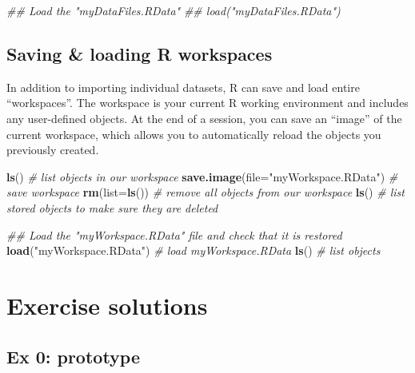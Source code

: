 \documentclass[]{book}
\newenvironment{Shaded}{\begin{snugshade}}{\end{snugshade}}
\newcommand{\CommentTok}[1]{\textcolor[rgb]{0.56,0.35,0.01}{\textit{#1}}}
\newcommand{\DataTypeTok}[1]{\textcolor[rgb]{0.13,0.29,0.53}{#1}}
\newcommand{\KeywordTok}[1]{\textcolor[rgb]{0.13,0.29,0.53}{\textbf{#1}}}
\newcommand{\NormalTok}[1]{#1}
\newcommand{\StringTok}[1]{\textcolor[rgb]{0.31,0.60,0.02}{#1}}
\begin{document}
\begin{Shaded}
\begin{Highlighting}[]
\CommentTok{## Load the "myDataFiles.RData"}
\CommentTok{## load("myDataFiles.RData") }
\end{Highlighting}
\end{Shaded}

\hypertarget{saving-loading-r-workspaces}{%
\subsection{Saving \& loading R workspaces}\label{saving-loading-r-workspaces}}

In addition to importing individual datasets, R can save and load entire
``workspaces''. The workspace is your current R working environment and includes
any user-defined objects. At the end of a session, you can save an ``image''
of the current workspace, which allows you to automatically reload the objects
you previously created.

\begin{Shaded}
\begin{Highlighting}[]
\KeywordTok{ls}\NormalTok{() }\CommentTok{# list objects in our workspace}
\KeywordTok{save.image}\NormalTok{(}\DataTypeTok{file=}\StringTok{"myWorkspace.RData"}\NormalTok{) }\CommentTok{# save workspace }
\KeywordTok{rm}\NormalTok{(}\DataTypeTok{list=}\KeywordTok{ls}\NormalTok{()) }\CommentTok{# remove all objects from our workspace }
\KeywordTok{ls}\NormalTok{() }\CommentTok{# list stored objects to make sure they are deleted}
\end{Highlighting}
\end{Shaded}

\begin{Shaded}
\begin{Highlighting}[]
\CommentTok{## Load the "myWorkspace.RData" file and check that it is restored}
\KeywordTok{load}\NormalTok{(}\StringTok{"myWorkspace.RData"}\NormalTok{) }\CommentTok{# load myWorkspace.RData}
\KeywordTok{ls}\NormalTok{() }\CommentTok{# list objects}
\end{Highlighting}
\end{Shaded}

\hypertarget{exercise-solutions}{%
\section{Exercise solutions}\label{exercise-solutions}}

\hypertarget{ex-0-prototype}{%
\subsection{Ex 0: prototype}\label{ex-0-prototype}}
\end{document}
